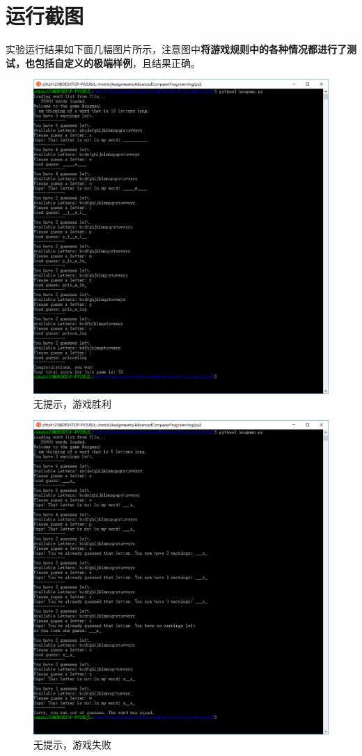 \documentclass[logo,reportComp]{thesis}
\begin{document}
\section{运行截图}
实验运行结果如下面几幅图片所示，注意图中\textbf{将游戏规则中的各种情况都进行了测试，也包括自定义的极端样例}，且结果正确。
\begin{figure}[H]
\centering
\includegraphics[width=\linewidth]{fig/win_no_hint.PNG}
\caption{无提示，游戏胜利}
\end{figure}
\begin{figure}[H]
\centering
\includegraphics[width=\linewidth]{fig/lose_no_hint.PNG}
\caption{无提示，游戏失败}
\end{figure}
\end{document}
